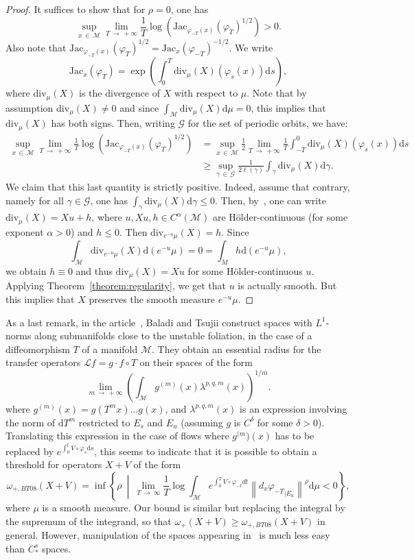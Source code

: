 \documentclass[10pt]{amsart}
\theoremstyle{definition}\newtheorem{defi}[theo]{Definition}\newtheorem{rema}[theo]{Remark}\newtheorem{exam}[theo]{Example}\newtheorem{exem}[theo]{Example}\newtheorem{nota}[theo]{Notation}
\newcommand{\mc}{\mathcal}
\newcommand{\M}{\mathcal{M}}
\newcommand{\ClL}{\mathcal{L}}
\newcommand{\dd}{\mathrm{d}}
\newcommand{\divv}{\mathrm{div}}
\newcommand{\Jac}{\mathrm{Jac}}
\begin{document}
\begin{proof}
It suffices to show that for $\rho=0$, one has
\[
\sup_{x\,\in\,\M} \lim_{T\,\to\,+\infty} \frac{1}{T}\log \left(\Jac_{\varphi_{-T}(x)}(\varphi_T)^{1/2} \right) > 0.
\]
Also note that $\Jac_{\varphi_{-T}(x)}(\varphi_T)^{1/2} = \Jac_{x}(\varphi_{-T})^{-1/2}$. We write
\[
\Jac_x(\varphi_{T}) = \exp\left(\int_0^T \divv_\mu(X)(\varphi_s(x)) \dd s \right),
\]
where $\divv_\mu(X)$ is the divergence of $X$ with respect to $\mu$. Note that by assumption $\divv_\mu(X) \neq 0$ and since $\int_{\M} \divv_\mu(X) \dd \mu = 0$, this implies that $\divv_\mu(X)$ has both signs. Then, writing $\mc{G}$ for the set of periodic orbits, we have:
\begin{align*}
\sup_{x\,\in\,\M} \lim_{T\,\to\,+\infty} \frac{1}{T}\log \left(\Jac_{\varphi_{-T}(x)}(\varphi_T)^{1/2} \right)& = \sup_{x\,\in\,\M} \frac{1}{2} \lim_{T\,\to\,+\infty} \frac{1}{T} \int_{-T}^{0} \divv_\mu(X)(\varphi_s(x)) \dd s \\
& \geq \sup_{\gamma\,\in\,\mc{G}} \frac{1}{2\ell(\gamma)} \int_\gamma \divv_\mu(X) \dd \gamma.
\end{align*}
We claim that this last quantity is strictly positive. Indeed, assume that contrary, namely for all $\gamma \in \mc{G}$, one has $\int_\gamma \divv_\mu(X) \dd \gamma \leq 0$. Then, by~\cite{Lopes-Thieullen-05}, one can write $\divv_\mu(X) = Xu + h$, where $u,Xu,h \in C^\alpha(\M)$ are H\"older-continuous (for some exponent $\alpha > 0$) and $h \leq 0$. Then $\divv_{e^{-u} \mu}(X) = h$. Since
\[
\int_{\M} \divv_{e^{-u }\mu}(X) \dd(e^{-u} \mu) = 0 = \int_{M} h \dd (e^{-u} \mu),
\]
we obtain $h \equiv 0$ and thus $\divv_\mu(X) = Xu$ for some H\"older-continuous $u$. Applying Theorem~\ref{theorem:regularity}, we get that $u$ is actually smooth. But this implies that $X$ preserves the smooth measure $e^{-u}\mu$.
\end{proof}

As a last remark, in the article~\cite{Baladi-Tsujii-08}, Baladi and Tsujii construct spaces with $L^1$-norms along submanifolds close to the unstable foliation, in the case of a diffeomorphism $T$ of a manifold $\M$. They obtain an essential radius for the transfer operators $\ClL f = g\cdot f\circ T$ on their spaces of the form
\[
\lim_{m\,\to\,+\infty} \left(\int_{\M} g^{(m)}(x) \lambda^{p,q,m}(x) \right)^{1/m}.
\]
where $g^{(m)}(x) = g(T^m x)\dots g(x)$, and $\lambda^{p,q,m}(x)$ is an expression involving the norm of $\dd T^m$ restricted to $E_s$ and $E_u$ (assuming $g$ is $C^\delta$ for some $\delta>0$). Translating this expression in the case of flows where $g^{(m})(x)$ has to be replaced by $e^{\int_0^t V \circ \varphi_s \dd s}$, this seems to indicate that it is possible to obtain a threshold for operators $X+V$ of the form
\[
\omega_{+,BT08}(X+V)=\inf\left\{ \rho \ \middle| \ \lim_{T\,\rightarrow \,\infty} \frac{1}{T}\log\int_{\M} e^{\int_0^T V\circ \varphi_{-t} dt} \left\|{d_x\varphi_{-T}}_{|E_u}\right\|^\rho \dd \mu < 0 \right\},
\]
where $\mu$ is a smooth measure. Our bound is similar but replacing the integral by the supremum of the integrand, so that $\omega_+(X+V) \geq \omega_{+,BT08}(X+V)$ in general. However, manipulation of the spaces appearing in~\cite{Baladi-Tsujii-08} is much less easy than $C^s_\ast$ spaces.
\end{document}
